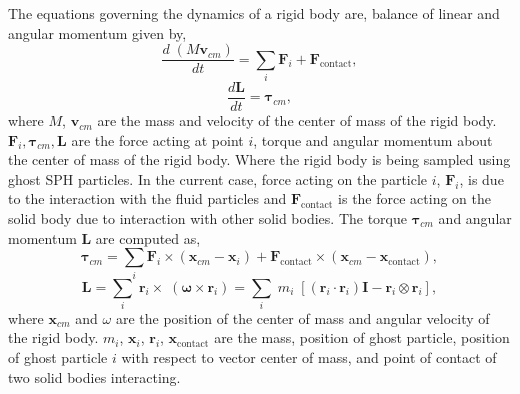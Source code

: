 \documentclass[preprint,12pt]{elsarticle}
\newcommand{\teng}[1]{\ensuremath{\boldsymbol{#1}}}
\newcommand{\ten}[1]{\ensuremath{\mathbf{#1}}}
\begin{document}
The equations governing the dynamics of a rigid body are, balance of linear and
angular momentum given by,
\begin{equation}
  \label{eq:rfc:balance_linear_mom}
  \frac{d \; (M \ten{v}_{cm})}{d t} = \sum_i \ten{F}_i + \ten{F}_{\text{contact}},
\end{equation}
\begin{equation}
  \label{eq:rfc:balance_angular_mom}
  \frac{d \ten{L}}{d t} = \teng{\tau}_{cm},
\end{equation}
where $M$, $\ten{v}_{cm}$ are the mass and velocity of the center of mass of
the rigid body.  $\ten{F}_i, \teng{\tau}_{cm}, \ten{L} $ are the force acting at
point $i$, torque and angular momentum about the center of mass of the rigid
body. Where the rigid body is being sampled using ghost SPH particles. In the
current case, force acting on the particle $i$, $\ten{F}_i$, is due to the
interaction with the fluid particles and $\ten{F}_{\text{contact}}$ is the
force acting on the solid body due to interaction with other solid bodies.
The torque $\teng{\tau}_{cm}$ and angular momentum $\ten{L}$ are computed as,
\begin{equation}
  \label{eq:rfc:torque}
  \teng{\tau}_{cm} = \sum_i \ten{F}_i \times (\ten{x}_{cm} - \ten{x}_{i}) + \ten{F}_{\text{contact}} \times (\ten{x}_{cm} - \ten{x}_{\text{contact}}),
\end{equation}
\begin{equation}
  \label{eq:rfc:moi}
  \teng{L} =
  \sum_i \; \ten{r}_i \times \; (\teng{\omega} \times \ten{r}_i)
  = \sum_i \; m_i \; [(\ten{r}_i \cdot \ten{r}_i) \ten{I} - \ten{r}_i \otimes \ten{r}_i],
\end{equation}
where $\ten{x}_{cm}$ and $\omega$ are the position of the center of mass and
angular velocity of the rigid body. $m_i$, $\ten{x}_{i}$, $\ten{r}_i$,
$\ten{x}_{\text{contact}}$ are the mass, position of ghost particle, position
of ghost particle $i$ with respect to vector center of mass, and point of
contact of two solid bodies interacting.
\end{document}
